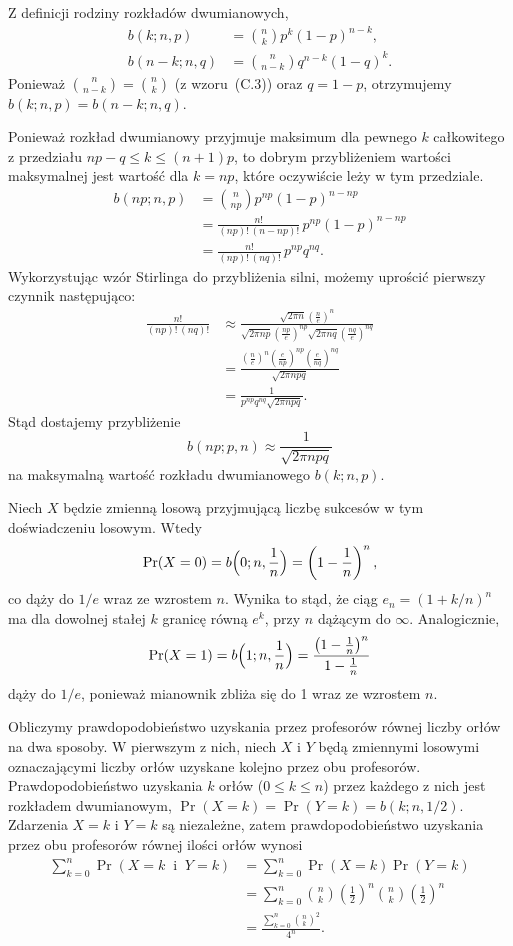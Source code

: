 \exercise{} %
Z definicji rodziny rozkładów dwumianowych,
\begin{align*}
	b(k;n,p) &= \binom{n}{k}p^k(1-p)^{n-k}, \\
	b(n-k;n,q) &= \binom{n}{n-k}q^{n-k}(1-q)^k.
\end{align*}
Ponieważ $\binom{n}{n-k}=\binom{n}{k}$ (z wzoru~(C.3)) oraz $q=1-p$, otrzymujemy $b(k;n,p)=b(n-k;n,q)$.

\exercise{} %
Ponieważ rozkład dwumianowy przyjmuje maksimum dla pewnego $k$ całkowitego z przedziału $np-q\le k\le(n+1)p$, to dobrym przybliżeniem wartości maksymalnej jest wartość dla $k=np$, które oczywiście leży w tym przedziale.
\begin{align*}
	b(np;n,p) &= \binom{n}{np}p^{np}(1-p)^{n-np} \\
	&= \frac{n!}{(np)!\,(n-np)!}\,p^{np}(1-p)^{n-np} \\
	&= \frac{n!}{(np)!\,(nq)!}\,p^{np}q^{nq}.
\end{align*}
Wykorzystując wzór Stirlinga do przybliżenia silni, możemy uprościć pierwszy czynnik następująco:
\begin{align*}
	\frac{n!}{(np)!\,(nq)!} &\approx \frac{\sqrt{2\pi n}\left(\frac{n}{e}\right)^n}{\sqrt{2\pi np}\left(\frac{np}{e}\right)^{np}\sqrt{2\pi nq}\left(\frac{nq}{e}\right)^{nq}} \\[1mm]
	&= \frac{\left(\frac{n}{e}\right)^n\left(\frac{e}{np}\right)^{np}\left(\frac{e}{nq}\right)^{nq}}{\sqrt{2\pi npq}} \\[1mm]
	&= \frac{1}{p^{np}q^{nq}\sqrt{2\pi npq}}.
\end{align*}
Stąd dostajemy przybliżenie
\[
	b(np;p,n) \approx \frac{1}{\sqrt{2\pi npq}}
\]
na maksymalną wartość rozkładu dwumianowego $b(k;n,p)$.

\exercise{} %
Niech $X$ będzie zmienną losową przyjmującą liczbę sukcesów w tym doświadczeniu losowym. Wtedy
\[
	\Pr(X=0) = b\Bigl(0;n,\frac{1}{n}\Bigr) = \left(1-\frac{1}{n}\right)^n,
\]
co dąży do $1/e$ wraz ze wzrostem $n$. Wynika to stąd, że ciąg $e_n={(1+k/n)}^n$ ma dla dowolnej stałej $k$ granicę równą $e^k$, przy $n$ dążącym do $\infty$.
Analogicznie,
\[
	\Pr(X=1) = b\Bigl(1;n,\frac{1}{n}\Bigr) = \frac{\left(1-\frac{1}{n}\right)^n}{1-\frac{1}{n}}
\]
dąży do $1/e$, ponieważ mianownik zbliża się do 1 wraz ze wzrostem $n$.

\exercise{} %
Obliczymy prawdopodobieństwo uzyskania przez profesorów równej liczby orłów na dwa sposoby. W pierwszym z nich, niech $X$ i $Y$ będą zmiennymi losowymi oznaczającymi liczby orłów uzyskane kolejno przez obu profesorów. Prawdopodobieństwo uzyskania $k$ orłów ($0\le k\le n$) przez każdego z nich jest rozkładem dwumianowym, $\Pr(X=k)=\Pr(Y=k)=b(k;n,1/2)$. Zdarzenia $X=k$ i $Y=k$ są niezależne, zatem prawdopodobieństwo uzyskania przez obu profesorów równej ilości orłów wynosi
\begin{align*}
	\sum_{k=0}^n\Pr(X=k\;\;\text{i}\;\;Y=k) &= \sum_{k=0}^n\Pr(X=k)\Pr(Y=k) \\
	&= \sum_{k=0}^n\binom{n}{k}\left(\frac{1}{2}\right)^n\binom{n}{k}\left(\frac{1}{2}\right)^n \\
	&= \frac{\sum_{k=0}^n\binom{n}{k}^2}{4^n}.
\end{align*}

